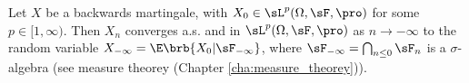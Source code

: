 



\begin{theorem}\label{thm:backwards_martingale_as_lp_closed_discrete}
Let $X$ be a backwards martingale, with $X_0 \in \sL^p(\Omega,\sF,\pro)$ for some $p \in [1,\infty)$. Then $X_n$ converges a.s. and in $\sL^p(\Omega,\sF,\pro)$ as $n \to -\infty$ to the random variable $X_{-\infty} = \E\brb{X_0|\sF_{-\infty}}$, where $\sF_{-\infty} = \bigcap_{n\leq 0}\sF_n$ is a $\sigma$-algebra (see measure theorey (Chapter \ref{cha:measure_theorey})).
\end{theorem}

